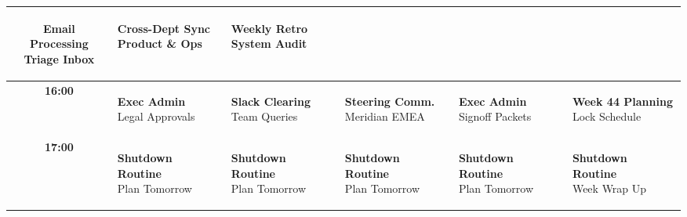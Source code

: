 \documentclass[10pt, landscape]{article}
\begin{document}
\begin{minipage}[t]{0.72\linewidth}
\begin{tabularx}{\linewidth}{|c|>{\raggedright\arraybackslash}X|>{\raggedright\arraybackslash}X|>{\raggedright\arraybackslash}X|>{\raggedright\arraybackslash}X|>{\raggedright\arraybackslash}X|}
    \colorbox{AdminBg}{\parbox[t]{0.92\linewidth}{\tiny\color{AdminTxt}\textbf{Email Processing}\\Triage Inbox}} &
    \colorbox{MeetingBg}{\parbox[t]{0.92\linewidth}{\tiny\color{MeetingTxt}\textbf{Cross-Dept Sync}\\Product \& Ops}} &
    \colorbox{DeepWorkBg}{\parbox[t]{0.92\linewidth}{\tiny\color{DeepWorkTxt}\textbf{Weekly Retro}\\System Audit}} \\
    \hline
    \textbf{16:00} &
    \colorbox{AdminBg}{\parbox[t]{0.92\linewidth}{\tiny\color{AdminTxt}\textbf{Exec Admin}\\Legal Approvals}} &
    \colorbox{AdminBg}{\parbox[t]{0.92\linewidth}{\tiny\color{AdminTxt}\textbf{Slack Clearing}\\Team Queries}} &
    \colorbox{MeetingBg}{\parbox[t]{0.92\linewidth}{\tiny\color{MeetingTxt}\textbf{Steering Comm.}\\Meridian EMEA}} &
    \colorbox{AdminBg}{\parbox[t]{0.92\linewidth}{\tiny\color{AdminTxt}\textbf{Exec Admin}\\Signoff Packets}} &
    \colorbox{AdminBg}{\parbox[t]{0.92\linewidth}{\tiny\color{AdminTxt}\textbf{Week 44 Planning}\\Lock Schedule}} \\
    \hline
    \textbf{17:00} &
    \colorbox{PersonalBg}{\parbox[t]{0.92\linewidth}{\tiny\color{PersonalTxt}\textbf{Shutdown Routine}\\Plan Tomorrow}} &
    \colorbox{PersonalBg}{\parbox[t]{0.92\linewidth}{\tiny\color{PersonalTxt}\textbf{Shutdown Routine}\\Plan Tomorrow}} &
    \colorbox{PersonalBg}{\parbox[t]{0.92\linewidth}{\tiny\color{PersonalTxt}\textbf{Shutdown Routine}\\Plan Tomorrow}} &
    \colorbox{PersonalBg}{\parbox[t]{0.92\linewidth}{\tiny\color{PersonalTxt}\textbf{Shutdown Routine}\\Plan Tomorrow}} &
    \colorbox{PersonalBg}{\parbox[t]{0.92\linewidth}{\tiny\color{PersonalTxt}\textbf{Shutdown Routine}\\Week Wrap Up}} \\
    \hline
  \end{tabularx}

\end{minipage}

\newpage

\end{document}
